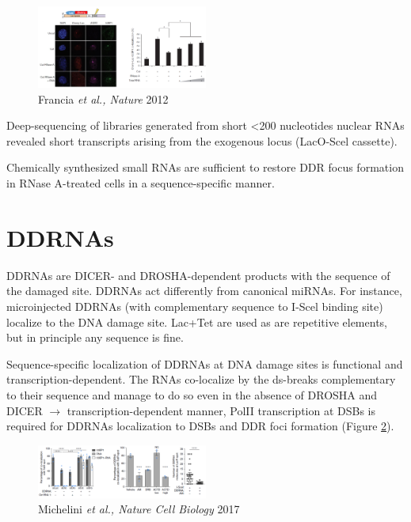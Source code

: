 \begin{figure}
\centering
\includegraphics[width=0.5\textwidth]{Screen_Shot_2022-12-07_at_09-03-41.png}
\caption{Francia \emph{et al., Nature} 2012}
\label{fig:lac}
\end{figure}

Deep-sequencing of libraries generated from short \textless200 nucleotides nuclear RNAs revealed short transcripts arising from the exogenous locus (LacO-Scel cassette).

Chemically synthesized small RNAs are sufficient to restore DDR focus formation in RNase A-treated cells in a sequence-specific manner.

\hypertarget{ddrnas}{%
\section{DDRNAs}\label{ddrnas}}

DDRNAs are DICER- and DROSHA-dependent products with the sequence of the damaged site. DDRNAs act differently from canonical miRNAs. For instance, microinjected DDRNAs (with complementary sequence to I-Scel binding site) localize to the DNA damage site. Lac+Tet are used as are repetitive elements, but in principle any sequence is fine.

Sequence-specific localization of DDRNAs at DNA damage sites is functional and transcription-dependent. The RNAs co-localize by the ds-breaks complementary to their sequence and manage to do so even in the absence of DROSHA and DICER $\rightarrow$ transcription-dependent manner, PolII transcription at DSBs is required for DDRNAs localization to DSBs and DDR foci formation (Figure \ref{fig:dd1}).

\begin{figure}
\centering
\includegraphics[width=0.5\textwidth]{Screen_Shot_2022-12-07_at_09-15-58.png}
\caption{Michelini \emph{et al., Nature Cell Biology} 2017}
\label{fig:dd1}
\end{figure}

